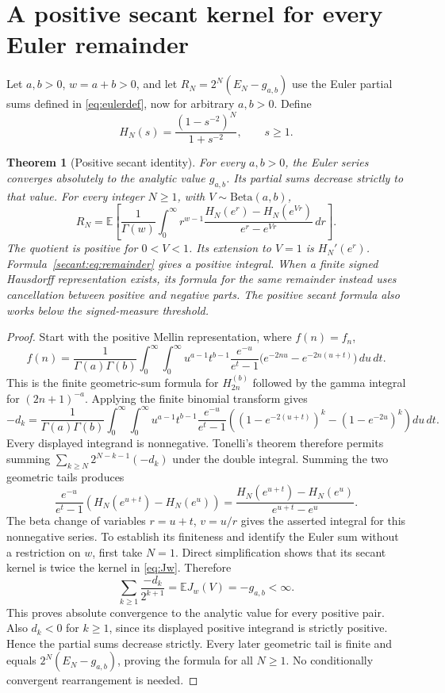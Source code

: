 \documentclass[11pt,a4paper]{article}
\numberwithin{equation}{section}
\newtheorem{theorem}{Theorem}[section]
\theoremstyle{definition}
\theoremstyle{remark}
\begin{document}
\section{A positive secant kernel for every Euler remainder}
\label{sec:secant}
Let $a,b>0$, $w=a+b>0$, and let $R_N=2^N(E_N-g_{a,b})$
use the Euler partial sums defined in \eqref{eq:eulerdef}, now for arbitrary $a,b>0$. Define
\[
 H_N(s)=\frac{(1-s^{-2})^N}{1+s^{-2}},\qquad s\ge1.
\]
\begin{theorem}[Positive secant identity]
For every $a,b>0$, the Euler series converges absolutely to the analytic
value $g_{a,b}$. Its partial sums decrease strictly to that value.
For every integer $N\ge1$, with $V\sim\mathrm{Beta}(a,b)$,
\begin{equation}\label{secant:eq:remainder}
 R_N=\mathbb E\!\left[\frac1{\Gamma(w)}\int_0^\infty
 r^{w-1}\frac{H_N(e^r)-H_N(e^{Vr})}{e^r-e^{Vr}}\,dr\right].
\end{equation}
The quotient is positive for $0<V<1$. Its extension to $V=1$ is
$H_N'(e^r)$. Formula~\eqref{secant:eq:remainder} gives a positive
integral. When a finite signed Hausdorff representation exists, its
formula for the same remainder instead uses cancellation between
positive and negative parts. The positive secant formula also works
below the signed-measure threshold.
\end{theorem}
\begin{proof}

Start with the positive Mellin representation, where $f(n)=f_n$,
\[
 f(n)=\frac1{\Gamma(a)\Gamma(b)}\int_0^\infty\!\int_0^\infty
 u^{a-1}t^{b-1}\frac{e^{-u}}{e^t-1}
 \bigl(e^{-2nu}-e^{-2n(u+t)}\bigr)\,du\,dt.
\]
This is the finite geometric-sum formula for $H_{2n}^{(b)}$ followed
by the gamma integral for $(2n+1)^{-a}$. Applying the finite binomial
transform gives
\[
 -d_k=\frac1{\Gamma(a)\Gamma(b)}\int_0^\infty\!\int_0^\infty
 u^{a-1}t^{b-1}\frac{e^{-u}}{e^t-1}
 \left((1-e^{-2(u+t)})^k-(1-e^{-2u})^k\right)du\,dt.
\]
Every displayed integrand is nonnegative. Tonelli's theorem therefore
permits summing $\sum_{k\ge N}2^{N-k-1}(-d_k)$ under the double
integral. Summing the two geometric tails produces
\[
 \frac{e^{-u}}{e^t-1}
 \left(H_N(e^{u+t})-H_N(e^u)\right)
 =\frac{H_N(e^{u+t})-H_N(e^u)}{e^{u+t}-e^u}.
\]
The beta change of variables $r=u+t$, $v=u/r$ gives the asserted
integral for this nonnegative series. To establish its finiteness and
identify the Euler sum without a restriction on $w$, first take $N=1$.
Direct simplification shows that its secant kernel is twice the
kernel in \eqref{eq:Jw}. Therefore
\[
 \sum_{k\ge1}\frac{-d_k}{2^{k+1}}
   =\mathbb E J_w(V)=-g_{a,b}<\infty.
\]
This proves absolute convergence to the analytic value for every
positive pair. Also $d_k<0$ for $k\ge1$, since its displayed positive
integrand is strictly positive. Hence the partial sums decrease
strictly. Every later geometric tail is finite and equals
$2^N(E_N-g_{a,b})$, proving the formula for all $N\ge1$.
No conditionally convergent rearrangement is needed.
\end{proof}
\end{document}
